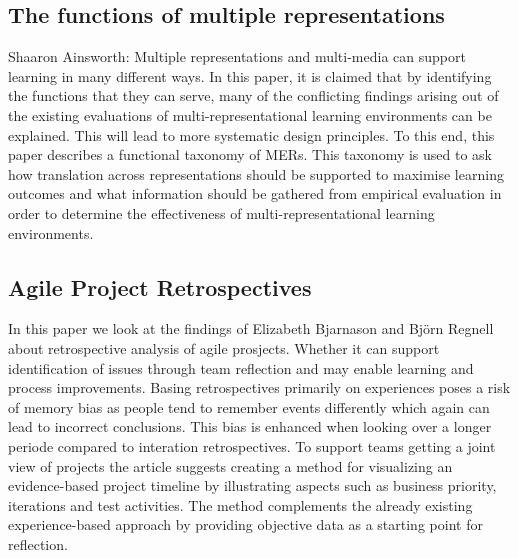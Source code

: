 \subsection{The functions of multiple representations}
Shaaron Ainsworth: Multiple representations and multi-media can support learning in many different ways\cite{Ainsworth1999}. In this paper, it is claimed that by identifying the functions that they can serve, many of the conflicting findings arising out of the existing evaluations of multi-representational learning environments can be explained. This will lead to more systematic design principles. To this end, this paper describes a functional taxonomy of MERs. This taxonomy is used to ask how translation across representations should be supported to maximise learning outcomes and what information should be gathered from empirical evaluation in order to determine the effectiveness of multi-representational learning environments.

\subsection{Agile Project Retrospectives}
In this paper we look at the findings of Elizabeth Bjarnason and Björn Regnell about retrospective analysis of agile prosjects\cite{Bjarnason2012}. Whether it can support identification of issues through team reflection and may enable learning and process improvements. Basing retrospectives primarily on experiences poses a risk of memory bias as people tend to remember events differently which again can lead to incorrect conclusions. This bias is enhanced when looking over a longer periode compared to interation retrospectives. To support teams getting a joint view of projects the article suggests creating a method for visualizing an evidence-based project timeline by illustrating aspects such as business priority, iterations and test activities. The method complements the already existing experience-based approach by providing objective data as a starting point for reflection.
